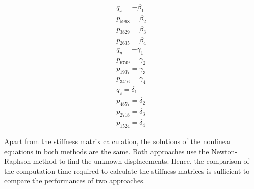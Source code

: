 \begin{equation}
\begin{array}{l}
q_{x} = -\beta_{1} \\
p_{5968} = \beta_{2} \\
p_{3829} = \beta_{3} \\
p_{2635} = \beta_{4} \\
q_{y} = -\gamma_{1} \\
p_{6749} = \gamma_{2} \\
p_{1937} = \gamma_{3} \\
p_{3416} = \gamma_{4} \\
q_{z} = \delta_{1} \\
p_{4857} = \delta_{2} \\
p_{2718} = \delta_{3} \\
p_{1524}= \delta_{4}
\end{array}
\label{eqn:4.16}
\end{equation}

Apart from the stiffness matrix calculation, the solutions of the nonlinear equations in both methods are the same. Both approaches use the Newton-Raphson method to find the unknown displacements. Hence, the comparison of the computation time required to calculate the stiffness matrices is sufficient to compare the performances of two approaches.


